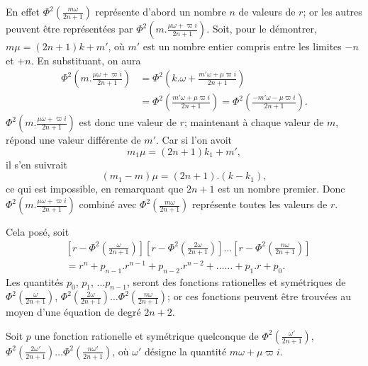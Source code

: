 \documentclass{article}
\begin{document}
En effet $\Phi^{2}\left(\frac{m\omega}{2n+1}\right)$ représente d'abord un nombre $n$ de valeurs de $r$; or les autres peuvent être représentées par $\Phi^{2}\left(m.\frac{\mu\omega+\varpi i}{2n+1}\right)$. Soit, pour le démontrer, $m\mu=(2n+1)k+m'$, où $m'$ est un nombre entier compris entre les limites $-n$ et $+n$. En substituant, on aura
\[ \begin{aligned}
\Phi^{2}\left(m.\frac{\mu\omega+\varpi i}{2n+1}\right)&=\Phi^{2}\left(k.\omega+\frac{m'\omega+\mu\varpi i}{2n+1}\right)\\
&=\Phi^{2}\left(\frac{m'\omega+\mu\varpi i}{2n+1}\right)=\Phi^{2}\left(\frac{-m'\omega-\mu\varpi i}{2n+1}\right).
\end{aligned} \]
$\Phi^{2}\left(m.\frac{\mu\omega+\varpi i}{2n+1}\right)$ est donc une valeur de $r$; maintenant à chaque valeur de $m$, répond une valeur différente de $m'$. Car si l'on avoit
\[ m_{1}\mu=(2n+1)k_{1}+m', \]
il s'en suivrait
\[ (m_{1}-m)\mu=(2n+1).(k-k_{1}), \]
ce qui est impossible, en remarquant que $2n+1$ est un nombre premier. Donc $\Phi^{2}\left(m.\frac{\mu\omega+\varpi i}{2n+1}\right)$ combiné avec $\Phi^{2}\left(\frac{m\omega}{2n+1}\right)$ représente toutes les valeurs de $r$.


Cela posé, soit
\[ \begin{aligned}
&\left[r-\Phi^{2}\left(\frac{\omega}{2n+1}\right)\right]\left[r-\Phi^{2}\left(\frac{2\omega}{2n+1}\right)\right]\ldots\left[r-\Phi^{2}\left(\frac{n\omega}{2n+1}\right)\right]\\
&=r^{n}+p_{n-1}.r^{n-1}+p_{n-2}.r^{n-2}+\ldots\ldots+p_{1}.r+p_{0}.
\end{aligned} \tag{93.} \]
Les quantités $p_{0}$, $p_{1}$, $\ldots p_{n-1}$, seront des fonctions rationelles et symétriques de $\Phi^{2}\left(\frac{\omega}{2n+1}\right)$, $\Phi^{2}\left(\frac{2\omega}{2n+1}\right)\ldots\Phi^{2}\left(\frac{n\omega}{2n+1}\right)$; or ces fonctions peuvent être trouvées au moyen d'une équation de degré $2n+2$.

Soit $p$ une fonction rationelle et symétrique quelconque de $\Phi^{2}\left(\frac{\omega'}{2n+1}\right)$, $\Phi^{2}\left(\frac{2\omega'}{2n+1}\right)\ldots\Phi^{2}\left(\frac{n\omega'}{2n+1}\right)$, où $\omega'$ désigne la quantité $m\omega+\mu\varpi i$.
\end{document}
